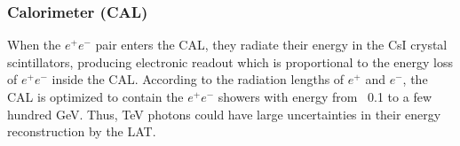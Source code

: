 

\subsubsection{Calorimeter (CAL)}

When the $e^+e^-$ pair enters the CAL, they radiate their energy
in the CsI crystal scintillators, producing electronic readout
which is proportional to the energy loss of $e^+e^-$ inside the CAL.
According to the radiation lengths of $e^+$ and $e^-$,
the CAL is optimized to contain the $e^+e^-$ showers with
energy from ~0.1 to a few hundred GeV. Thus, TeV photons
could have large uncertainties in their energy reconstruction
by the LAT.


